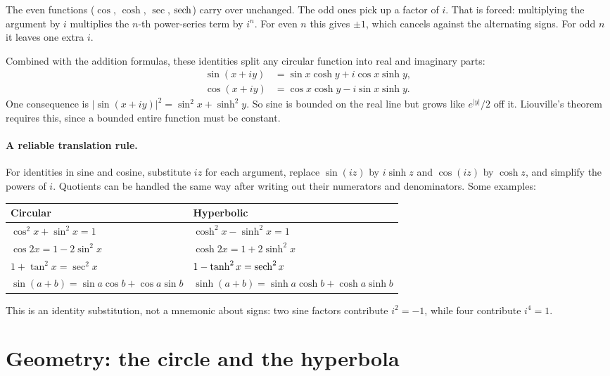 \documentclass{essay}
\begin{document}
The even functions ($\cos$, $\cosh$, $\sec$, $\operatorname{sech}$) carry over unchanged. The
odd ones pick up a factor of $i$. That is forced: multiplying the argument by
$i$ multiplies the $n$-th power-series term by $i^n$. For even $n$ this gives
$\pm 1$, which cancels against the alternating signs. For odd $n$ it leaves one
extra $i$.

Combined with the addition formulas, these identities split any circular
function into real and imaginary parts:
\begin{align*}
  \sin(x + iy) &= \sin x \cosh y + i \cos x \sinh y, \\
  \cos(x + iy) &= \cos x \cosh y - i \sin x \sinh y .
\end{align*}
One consequence is $|\sin(x + iy)|^2 = \sin^2 x + \sinh^2 y$. So sine is bounded
on the real line but grows like $e^{|y|}/2$ off it. Liouville's theorem requires
this, since a bounded entire function must be constant.

\paragraph{A reliable translation rule.}
For identities in sine and cosine, substitute $iz$ for each argument, replace
$\sin(iz)$ by $i\sinh z$ and $\cos(iz)$ by $\cosh z$, and simplify the powers of
$i$. Quotients can be handled the same way after writing out their numerators
and denominators. Some examples:
\begin{center}
\begin{tabular}{ll}
\toprule
Circular & Hyperbolic \\
\midrule
$\cos^2 x + \sin^2 x = 1$ & $\cosh^2 x - \sinh^2 x = 1$ \\
$\cos 2x = 1 - 2\sin^2 x$ & $\cosh 2x = 1 + 2\sinh^2 x$ \\
$1 + \tan^2 x = \sec^2 x$ & $1 - \tanh^2 x = \operatorname{sech}^2 x$ \\
$\sin(a+b) = \sin a \cos b + \cos a \sin b$
  & $\sinh(a+b) = \sinh a \cosh b + \cosh a \sinh b$ \\
\bottomrule
\end{tabular}
\end{center}
This is an identity substitution, not a mnemonic about signs: two sine factors
contribute $i^2=-1$, while four contribute $i^4=1$.

\section{Geometry: the circle and the hyperbola}
\end{document}
